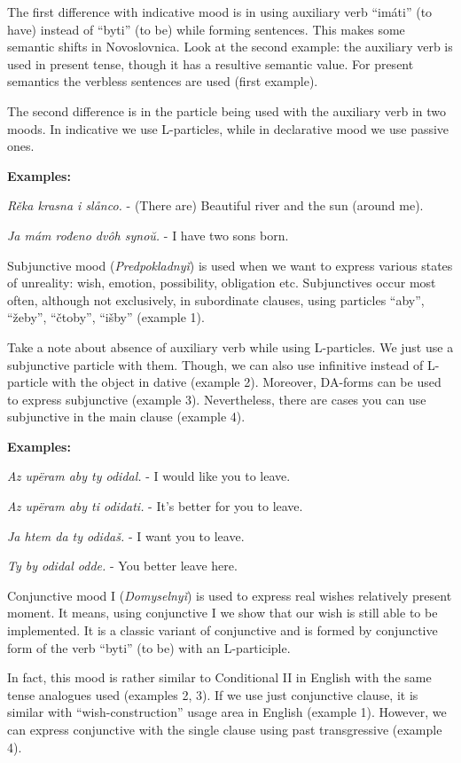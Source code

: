 The first difference with indicative mood is in using auxiliary verb “imáti” (to have) instead of “byti” (to be) while forming sentences. This makes some semantic shifts in Novoslovnica. Look at the second example: the auxiliary verb is used in present tense, though it has a resultive semantic value. For present semantics the verbless sentences are used (first example).

The second difference is in the particle being used with the auxiliary verb in two moods. In indicative we use L-particles, while in declarative mood we use passive ones.

\textbf{Examples:}

\textit{Rěka krasna i slånco.} - (There are) Beautiful river and the sun (around me).

\textit{Ja mám rođeno dvôh synoŭ.} - I have two sons born.

Subjunctive mood (\textit{Predpokladnyǐ}) is used when we want to express various states of unreality: wish, emotion, possibility, obligation etc. Subjunctives occur most often, although not exclusively, in subordinate clauses, using particles “aby”, “žeby”, “čtoby”, “išby” (example 1).

Take a note about absence of auxiliary verb while using L-particles. We just use a subjunctive particle with them. Though, we can also use infinitive instead of L-particle with the object in dative (example 2). Moreover, DA-forms can be used to express subjunctive (example 3). Nevertheless, there are cases you can use subjunctive in the main clause (example 4). 

\textbf{Examples:}

\textit{Az upëram aby ty odidal.} - I would like you to leave.

\textit{Az upëram aby ti odidati.} - It’s better for you to leave.

\textit{Ja htem da ty odidaš.} - I want you to leave.

\textit{Ty by odidal odde.} - You better leave here.

Conjunctive mood I (\textit{Domyselnyǐ}) is used to express real wishes relatively present moment. It means, using conjunctive I we show that our wish is still able to be implemented. It is a classic variant of conjunctive and is formed by conjunctive form of the verb “byti” (to be) with an L-participle.

In fact, this mood is rather similar to Conditional II in English with the same tense analogues used (examples 2, 3). If we use just conjunctive clause, it is similar with “wish-construction” usage area in English (example 1). However, we can express conjunctive with the single clause using past transgressive (example 4).

